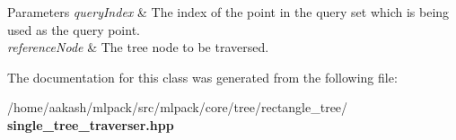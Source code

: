 \begin{DoxyParams}{Parameters}
{\em query\+Index} & The index of the point in the query set which is being used as the query point. \\
\hline
{\em reference\+Node} & The tree node to be traversed. \\
\hline
\end{DoxyParams}


The documentation for this class was generated from the following file\+:\begin{DoxyCompactItemize}
\item 
/home/aakash/mlpack/src/mlpack/core/tree/rectangle\+\_\+tree/\textbf{ single\+\_\+tree\+\_\+traverser.\+hpp}\end{DoxyCompactItemize}

